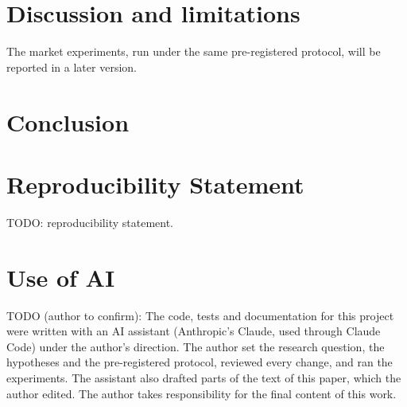 \documentclass{article}
\begin{document}
\section{Discussion and limitations}
\label{sec:discussion}


The market experiments, run under the same pre-registered protocol, will be reported in a later
version.

\section{Conclusion}
\label{sec:conclusion}



\section*{Reproducibility Statement}

TODO: reproducibility statement.

\section*{Use of AI}

TODO (author to confirm): The code, tests and documentation for this project were written with an AI assistant (Anthropic's
Claude, used through Claude Code) under the author's direction. The author set the research
question, the hypotheses and the pre-registered protocol, reviewed every change, and ran the
experiments. The assistant also drafted parts of the text of this paper, which the author edited.
The author takes responsibility for the final content of this work.
\end{document}
